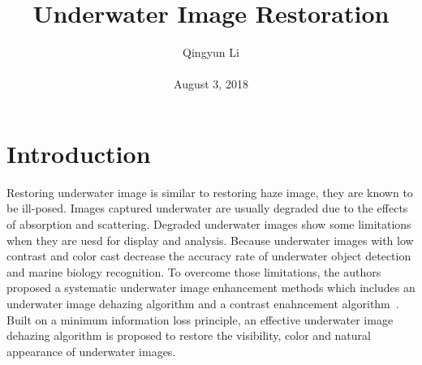 \documentclass[10pt,twocolumn,letterpaper]{article}
\begin{document}
\author{Qingyun Li\\\\
August 3, 2018}        
\title{Underwater Image Restoration}

\maketitle

\section{Introduction}
\par Restoring underwater image is similar to restoring haze image, they are known to be ill-posed. Images captured underwater are usually degraded due to the effects of absorption and scattering. Degraded underwater images show some limitations when they are uesd for display and analysis. Because underwater images with low contrast and color cast decrease the accuracy rate of underwater object detection and marine biology recognition. To overcome those limitations, the authors proposed a systematic underwater image enhancement methods which includes an underwater image dehazing algorithm and a contrast enahncement algorithm~\cite{Li2016Underwater}. Built on a minimum information loss principle, an effective underwater image dehazing algorithm is proposed to restore the visibility, color and natural appearance of underwater images. 
\end{document}
